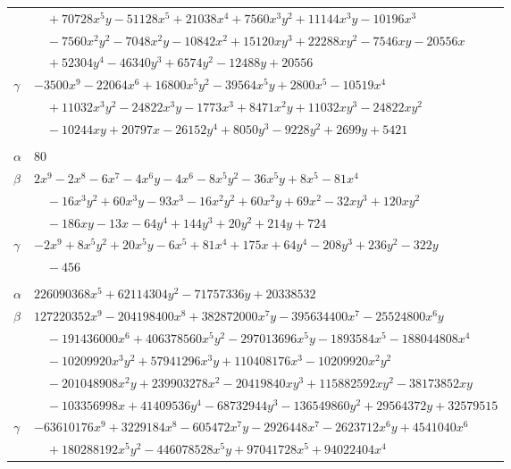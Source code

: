 \documentclass[11pt]{article}
\begin{document}
\begin{longtable}{@{}ll@{}}
 & $\quad +70728x^{5}y-51128x^{5}+21038x^{4}+7560x^{3}y^{2}+11144x^{3}y-10196x^{3}$\\
 & $\quad -7560x^{2}y^{2}-7048x^{2}y-10842x^{2}+15120xy^{3}+22288xy^{2}-7546xy-20556x$\\
 & $\quad +52304y^{4}-46340y^{3}+6574y^{2}-12488y+20556$\\
$\gamma$ & $-3500x^{9}-22064x^{6}+16800x^{5}y^{2}-39564x^{5}y+2800x^{5}-10519x^{4}$\\
 & $\quad +11032x^{3}y^{2}-24822x^{3}y-1773x^{3}+8471x^{2}y+11032xy^{3}-24822xy^{2}$\\
 & $\quad -10244xy+20797x-26152y^{4}+8050y^{3}-9228y^{2}+2699y+5421$\\
\addlinespace[3pt]
\multicolumn{2}{@{}l}{$\{i,j\}=\{19,24\}$, $k_{ij}=2^{2}\cdot 5^{2}\cdot 11$}\\
$\alpha$ & $80$\\
$\beta$ & $2x^{9}-2x^{8}-6x^{7}-4x^{6}y-4x^{6}-8x^{5}y^{2}-36x^{5}y+8x^{5}-81x^{4}$\\
 & $\quad -16x^{3}y^{2}+60x^{3}y-93x^{3}-16x^{2}y^{2}+60x^{2}y+69x^{2}-32xy^{3}+120xy^{2}$\\
 & $\quad -186xy-13x-64y^{4}+144y^{3}+20y^{2}+214y+724$\\
$\gamma$ & $-2x^{9}+8x^{5}y^{2}+20x^{5}y-6x^{5}+81x^{4}+175x+64y^{4}-208y^{3}+236y^{2}-322y$\\
 & $\quad -456$\\
\addlinespace[3pt]
\multicolumn{2}{@{}l}{$\{i,j\}=\{19,33\}$, $k_{ij}=2\cdot 3\cdot 5\cdot 17^{2}$}\\
$\alpha$ & $226090368x^{5}+62114304y^{2}-71757336y+20338532$\\
$\beta$ & $127220352x^{9}-204198400x^{8}+382872000x^{7}y-395634400x^{7}-25524800x^{6}y$\\
 & $\quad -191436000x^{6}+406378560x^{5}y^{2}-297013696x^{5}y-1893584x^{5}-188044808x^{4}$\\
 & $\quad -10209920x^{3}y^{2}+57941296x^{3}y+110408176x^{3}-10209920x^{2}y^{2}$\\
 & $\quad -201048908x^{2}y+239903278x^{2}-20419840xy^{3}+115882592xy^{2}-38173852xy$\\
 & $\quad -103356998x+41409536y^{4}-68732944y^{3}-136549860y^{2}+29564372y+32579515$\\
$\gamma$ & $-63610176x^{9}+3229184x^{8}-605472x^{7}y-2926448x^{7}-2623712x^{6}y+4541040x^{6}$\\
 & $\quad +180288192x^{5}y^{2}-446078528x^{5}y+97041728x^{5}+94022404x^{4}$\\

\end{longtable}
\end{document}
